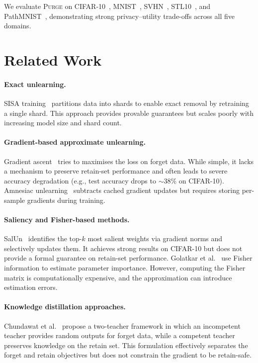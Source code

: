 \documentclass[10pt,twocolumn]{article}
\newcommand{\ours}{\textsc{Purge}}
\begin{document}
We evaluate \ours{} on CIFAR-10~\cite{krizhevsky2009cifar}, MNIST~\cite{lecun1998mnist}, SVHN~\cite{netzer2011svhn}, STL10~\cite{coates2011stl10}, and PathMNIST~\cite{yang2023medmnist}, demonstrating strong privacy--utility trade-offs across all five domains.

\section{Related Work}\label{sec:related}

\paragraph{Exact unlearning.}
SISA training~\cite{bourtoule2021sisa} partitions data into shards to enable exact removal by retraining a single shard.
This approach provides provable guarantees but scales poorly with increasing model size and shard count.

\paragraph{Gradient-based approximate unlearning.}
Gradient ascent~\cite{thudi2022unrolling} tries to maximises the loss on forget data.
While simple, it lacks a mechanism to preserve retain-set performance and often leads to severe accuracy degradation (e.g., test accuracy drops to $\sim$38\% on CIFAR-10).
Amnesiac unlearning~\cite{graves2021amnesiac} subtracts cached gradient updates but requires storing per-sample gradients during training.

\paragraph{Saliency and Fisher-based methods.}
SalUn~\cite{fan2024salun} identifies the top-$k$ most salient weights via gradient norms and selectively updates them.
It achieves strong results on CIFAR-10 but does not provide a formal guarantee on retain-set performance.
Golatkar et al.~\cite{golatkar2020eternal,golatkar2021scrubbing} use Fisher information to estimate parameter importance.
However, computing the Fisher matrix is computationally expensive, and the approximation can introduce estimation errors.

\paragraph{Knowledge distillation approaches.}
Chundawat et al.~\cite{chundawat2023badteacher} propose a two-teacher framework in which an incompetent teacher provides random outputs for forget data, while a competent teacher preserves knowledge on the retain set.
This formulation effectively separates the forget and retain objectives but does not constrain the gradient to be retain-safe.
\end{document}
